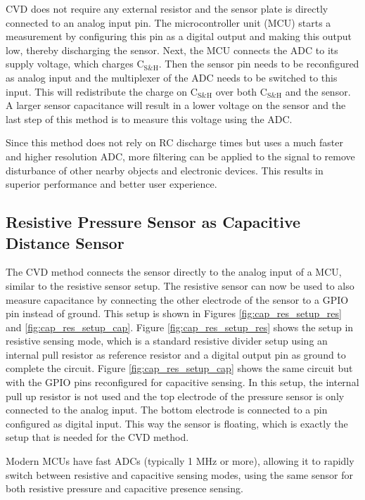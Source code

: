 \documentclass{sigchi-ext}
\begin{document}
CVD does not require any external resistor and the sensor plate is directly connected to an analog input pin.  The microcontroller unit (MCU) starts a
measurement by configuring this pin as a digital output and making this output low,
thereby discharging the sensor. Next, the MCU connects the 
ADC to its supply voltage, which charges $\textrm{C}_{\textrm{S\&H}}$.
Then the sensor pin needs to be reconfigured as analog input and the
multiplexer of the ADC needs to be switched to this input. This will
redistribute the charge on $\textrm{C}_{\textrm{S\&H}}$ over both
$\textrm{C}_{\textrm{S\&H}}$ and the sensor. A larger sensor
capacitance will result in a lower voltage on the sensor and the last step of
this method is to measure this voltage using the ADC.

Since this method does not rely on RC discharge times but uses 
a much faster and higher resolution ADC, more filtering can be applied to the signal to remove
disturbance of other nearby objects and electronic devices. This results in
superior performance and better user experience.

\subsection{Resistive Pressure Sensor as Capacitive Distance Sensor}
The CVD method connects the sensor directly to the analog input of a
MCU, similar to the resistive sensor setup. The resistive sensor can
now be used to also measure capacitance by connecting the other electrode of the
sensor to a GPIO pin instead of ground. This setup is shown in Figures
\ref{fig:cap_res_setup_res} and \ref{fig:cap_res_setup_cap}. Figure \ref{fig:cap_res_setup_res} shows the setup in resistive sensing mode,
which is a standard resistive divider setup using an internal pull resistor
as reference resistor and a digital output pin as ground to complete the
circuit. Figure \ref{fig:cap_res_setup_cap} shows the same circuit but with the GPIO pins
reconfigured for capacitive sensing. In this setup, the internal pull up
resistor is not used and the top electrode of the pressure sensor is only
connected to the analog input. The bottom electrode is connected to a pin 
configured as digital input. This way the sensor is
floating, which is exactly the setup that is needed for the CVD method.

Modern MCUs have fast ADCs (typically 1 MHz or more), allowing it to rapidly switch between
resistive and capacitive sensing modes, using the same sensor for both
resistive pressure and capacitive presence sensing.
\end{document}
